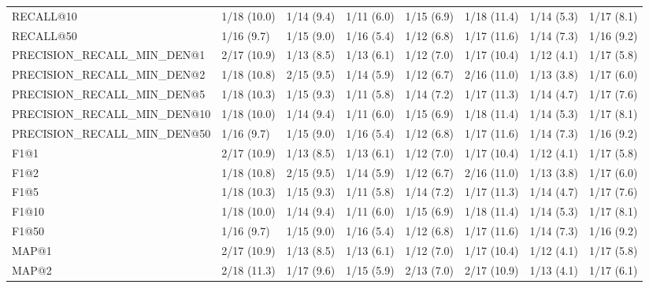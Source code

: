 \begin{tabular}{llllllll}
RECALL@10                   &     1/18 (10.0) &       1/14 (9.4) &  1/11 (6.0) &  1/15 (6.9) &  1/18 (11.4) &     1/14 (5.3) &            1/17 (8.1) \\
RECALL@50                   &      1/16 (9.7) &       1/15 (9.0) &  1/16 (5.4) &  1/12 (6.8) &  1/17 (11.6) &     1/14 (7.3) &            1/16 (9.2) \\
PRECISION_RECALL_MIN_DEN@1  &     2/17 (10.9) &       1/13 (8.5) &  1/13 (6.1) &  1/12 (7.0) &  1/17 (10.4) &     1/12 (4.1) &            1/17 (5.8) \\
PRECISION_RECALL_MIN_DEN@2  &     1/18 (10.8) &       2/15 (9.5) &  1/14 (5.9) &  1/12 (6.7) &  2/16 (11.0) &     1/13 (3.8) &            1/17 (6.0) \\
PRECISION_RECALL_MIN_DEN@5  &     1/18 (10.3) &       1/15 (9.3) &  1/11 (5.8) &  1/14 (7.2) &  1/17 (11.3) &     1/14 (4.7) &            1/17 (7.6) \\
PRECISION_RECALL_MIN_DEN@10 &     1/18 (10.0) &       1/14 (9.4) &  1/11 (6.0) &  1/15 (6.9) &  1/18 (11.4) &     1/14 (5.3) &            1/17 (8.1) \\
PRECISION_RECALL_MIN_DEN@50 &      1/16 (9.7) &       1/15 (9.0) &  1/16 (5.4) &  1/12 (6.8) &  1/17 (11.6) &     1/14 (7.3) &            1/16 (9.2) \\
F1@1                        &     2/17 (10.9) &       1/13 (8.5) &  1/13 (6.1) &  1/12 (7.0) &  1/17 (10.4) &     1/12 (4.1) &            1/17 (5.8) \\
F1@2                        &     1/18 (10.8) &       2/15 (9.5) &  1/14 (5.9) &  1/12 (6.7) &  2/16 (11.0) &     1/13 (3.8) &            1/17 (6.0) \\
F1@5                        &     1/18 (10.3) &       1/15 (9.3) &  1/11 (5.8) &  1/14 (7.2) &  1/17 (11.3) &     1/14 (4.7) &            1/17 (7.6) \\
F1@10                       &     1/18 (10.0) &       1/14 (9.4) &  1/11 (6.0) &  1/15 (6.9) &  1/18 (11.4) &     1/14 (5.3) &            1/17 (8.1) \\
F1@50                       &      1/16 (9.7) &       1/15 (9.0) &  1/16 (5.4) &  1/12 (6.8) &  1/17 (11.6) &     1/14 (7.3) &            1/16 (9.2) \\
MAP@1                       &     2/17 (10.9) &       1/13 (8.5) &  1/13 (6.1) &  1/12 (7.0) &  1/17 (10.4) &     1/12 (4.1) &            1/17 (5.8) \\
MAP@2                       &     2/18 (11.3) &       1/17 (9.6) &  1/15 (5.9) &  2/13 (7.0) &  2/17 (10.9) &     1/13 (4.1) &            1/17 (6.1) \\

\end{tabular}
